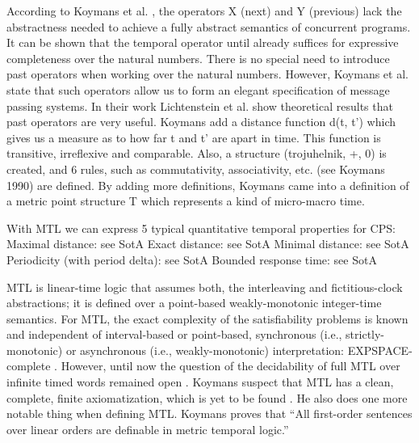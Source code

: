 According to Koymans et al. \cite{Koymans:RealTimeProgramming}, the operators X (next) and Y (previous) lack the abstractness needed to achieve a fully abstract semantics of concurrent programs. It can be shown that the temporal operator until already suffices for expressive completeness over the natural numbers. There is no special need to introduce past operators when working over the natural numbers. However, Koymans et al. state that such operators allow us to form an elegant specification of message passing systems. In their work Lichtenstein et al. \cite{Lichtenstein:LogicOfPrograms} show theoretical results that past operators are very useful. Koymans add a distance function d(t, t’) which gives us a measure as to how far t and t’ are apart in time. This function is transitive, irreflexive and comparable. Also, a structure (trojuhelnik, +, 0) is created, and 6 rules, such as commutativity, associativity, etc. (see Koymans 1990) are defined. By adding more definitions, Koymans came into a definition of a metric point structure T which represents a kind of micro-macro time. 

With MTL we can express 5 typical quantitative temporal properties for CPS:
Maximal distance: see SotA
Exact distance: see SotA
Minimal distance: see SotA
Periodicity (with period delta): see SotA
Bounded response time: see SotA

MTL is linear-time logic that assumes both, the interleaving and fictitious-clock abstractions; it is defined over a point-based weakly-monotonic integer-time semantics. For MTL, the exact complexity of the satisfiability problems is known and independent of interval-based or point-based, synchronous (i.e., strictly-monotonic) or asynchronous (i.e., weakly-monotonic) interpretation: EXPSPACE-complete \cite{Rajeev:ModelsOfRealTime}. However, until now the question of the decidability of full MTL over infinite timed words remained open \cite{Ouaknine:MTLfaulty}. Koymans suspect that MTL has a clean, complete, finite axiomatization, which is yet to be found \cite{Koymans:MTL}. He also does one more notable thing when defining MTL. Koymans proves that “All first-order sentences over linear orders are definable in metric temporal logic.”



